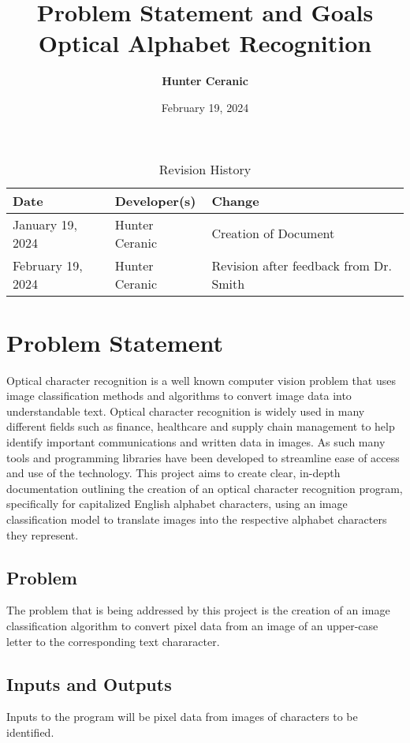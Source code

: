 \documentclass{article}
\title{Problem Statement and Goals\\Optical Alphabet Recognition}
\author{\textbf{Hunter Ceranic}}
\date{February 19, 2024}
\begin{document}
\maketitle

\begin{table}[hp]
\caption{Revision History} \label{TblRevisionHistory}
\begin{tabularx}{\textwidth}{llX}
\toprule
\textbf{Date} & \textbf{Developer(s)} & \textbf{Change}\\
\midrule
January 19, 2024 & Hunter Ceranic & Creation of Document\\
February 19, 2024 & Hunter Ceranic & Revision after feedback from Dr. Smith\\
\bottomrule
\end{tabularx}
\end{table}

\section{Problem Statement}
Optical character recognition is a well known computer vision problem that uses image classification methods and algorithms to
convert image data into understandable text. Optical character recognition is widely used in many different fields such as 
finance, healthcare and supply chain management to help identify important communications and written data in images. 
As such many tools and programming libraries have been developed to streamline ease of access and use of the technology. 
This project aims to create clear, in-depth documentation outlining the creation of an optical character recognition program,
specifically for capitalized English alphabet characters, using an image classification model to translate images into the 
respective alphabet characters they represent.

\subsection{Problem}
The problem that is being addressed by this project is the creation of an image classification algorithm to convert 
pixel data from an image of an upper-case letter to the corresponding text chararacter.
\subsection{Inputs and Outputs}
Inputs to the program will be pixel data from images of characters to be identified.
\end{document}
